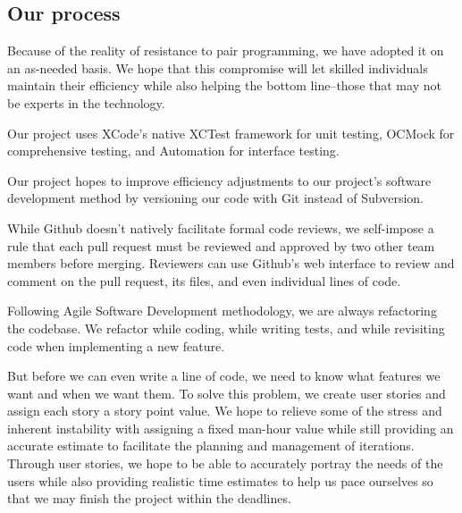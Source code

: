 
\subsection{Our process}
Because of the reality of resistance to pair programming, we have adopted it on an as-needed basis. We hope that this compromise will let skilled individuals maintain their efficiency while also helping the bottom line–those that may not be experts in the technology.

Our project uses XCode's native XCTest framework for unit testing, OCMock for comprehensive testing, and Automation for interface testing.

Our project hopes to improve efficiency adjustments to our project’s software development method by versioning our code with Git instead of Subversion.

While Github doesn’t natively facilitate formal code reviews, we self-impose a rule that each pull request must be reviewed and approved by two other team members before merging. Reviewers can use Github’s web interface to review and comment on the pull request, its files, and even individual lines of code. 


Following Agile Software Development methodology, we are always refactoring the codebase. We refactor while coding, while writing tests, and while revisiting code when implementing a new feature.

But before we can even write a line of code, we need to know what features we want and when we want them. To solve this problem, we create user stories and assign each story a story point value. We hope to relieve some of the stress and inherent instability with assigning a fixed man-hour value while still providing an accurate estimate to facilitate the planning and management of iterations. Through user stories, we hope to be able to accurately portray the needs of the users while also providing realistic time estimates to help us pace ourselves so that we may finish the project within the deadlines.